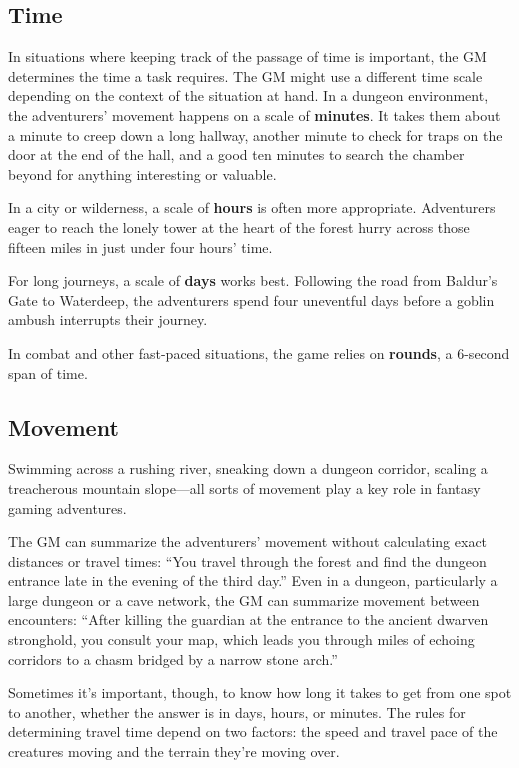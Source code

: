 \documentclass[
]{article}
\date{}
\begin{document}
\hypertarget{time}{%
\subsection{Time}\label{time}}

In situations where keeping track of the passage of time is important,
the GM determines the time a task requires. The GM might use a different
time scale depending on the context of the situation at hand. In a
dungeon environment, the adventurers' movement happens on a scale of
\textbf{minutes}. It takes them about a minute to creep down a long
hallway, another minute to check for traps on the door at the end of the
hall, and a good ten minutes to search the chamber beyond for anything
interesting or valuable.

In a city or wilderness, a scale of \textbf{hours} is often more
appropriate. Adventurers eager to reach the lonely tower at the heart of
the forest hurry across those fifteen miles in just under four hours'
time.

For long journeys, a scale of \textbf{days} works best. Following the
road from Baldur's Gate to Waterdeep, the adventurers spend four
uneventful days before a goblin ambush interrupts their journey.

In combat and other fast-paced situations, the game relies on
\textbf{rounds}, a 6-second span of time.

\hypertarget{movement}{%
\subsection{Movement}\label{movement}}

Swimming across a rushing river, sneaking down a dungeon corridor,
scaling a treacherous mountain slope---all sorts of movement play a key
role in fantasy gaming adventures.

The GM can summarize the adventurers' movement without calculating exact
distances or travel times: ``You travel through the forest and find the
dungeon entrance late in the evening of the third day.'' Even in a
dungeon, particularly a large dungeon or a cave network, the GM can
summarize movement between encounters: ``After killing the guardian at
the entrance to the ancient dwarven stronghold, you consult your map,
which leads you through miles of echoing corridors to a chasm bridged by
a narrow stone arch.''

Sometimes it's important, though, to know how long it takes to get from
one spot to another, whether the answer is in days, hours, or minutes.
The rules for determining travel time depend on two factors: the speed
and travel pace of the creatures moving and the terrain they're moving
over.
\end{document}
